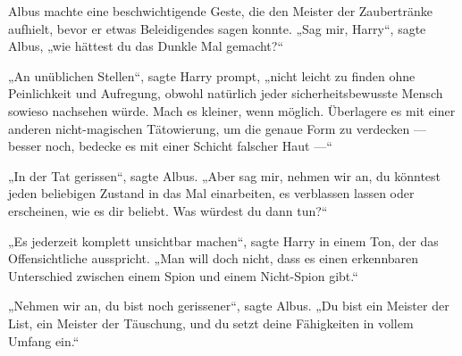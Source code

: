 Albus machte eine beschwichtigende Geste, die den Meister der Zaubertränke aufhielt, bevor er etwas Beleidigendes sagen konnte.
„Sag mir, Harry“, sagte Albus, „wie hättest du das Dunkle Mal gemacht?“

„An unüblichen Stellen“, sagte Harry prompt, „nicht leicht zu finden ohne Peinlichkeit und Aufregung, obwohl natürlich jeder sicherheitsbewusste Mensch sowieso nachsehen würde. Mach es kleiner, wenn möglich. Überlagere es mit einer anderen nicht-magischen Tätowierung, um die genaue Form zu verdecken — besser noch, bedecke es mit einer Schicht falscher Haut —“

„In der Tat gerissen“, sagte Albus.
„Aber sag mir, nehmen wir an, du könntest jeden beliebigen Zustand in das Mal einarbeiten, es verblassen lassen oder erscheinen, wie es dir beliebt. Was würdest du dann tun?“

„Es jederzeit komplett unsichtbar machen“, sagte Harry in einem Ton, der das Offensichtliche ausspricht.
„Man will doch nicht, dass es einen erkennbaren Unterschied zwischen einem Spion und einem Nicht-Spion gibt.“

„Nehmen wir an, du bist noch gerissener“, sagte Albus.
„Du bist ein Meister der List, ein Meister der Täuschung, und du setzt deine Fähigkeiten in vollem Umfang ein.“

